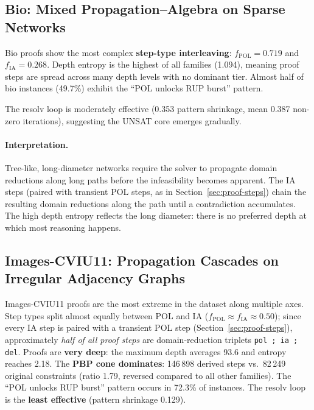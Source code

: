 \documentclass[11pt,a4paper]{article}
\begin{document}
\subsection{Bio: Mixed Propagation--Algebra on Sparse Networks}
\label{sec:fingerprint-bio}

Bio proofs show the most complex \textbf{step-type interleaving}: $f_{\mathrm{POL}} = 0.719$ and
$f_{\mathrm{IA}} = 0.268$.
Depth entropy is the highest of all families (1.094), meaning proof steps are spread across
many depth levels with no dominant tier.
Almost half of bio instances (49.7\%) exhibit the ``POL unlocks RUP burst'' pattern.

The resolv loop is moderately effective (0.353 pattern shrinkage, mean 0.387 non-zero iterations),
suggesting the UNSAT core emerges gradually.

\paragraph{Interpretation.} Tree-like, long-diameter networks require the solver to propagate
domain reductions along long paths before the infeasibility becomes apparent.
The IA steps (paired with transient POL steps, as in Section~\ref{sec:proof-steps}) chain the
resulting domain reductions along the path until a contradiction accumulates.
The high depth entropy reflects the long diameter: there is no preferred depth at which most
reasoning happens.

\subsection{Images-CVIU11: Propagation Cascades on Irregular Adjacency Graphs}
\label{sec:fingerprint-images}

Images-CVIU11 proofs are the most extreme in the dataset along multiple axes.
Step types split almost equally between POL and IA ($f_{\mathrm{POL}} \approx f_{\mathrm{IA}}
\approx 0.50$); since every IA step is paired with a transient POL step
(Section~\ref{sec:proof-steps}), approximately \emph{half of all proof steps} are
domain-reduction triplets \texttt{pol\,;\,ia\,;\,del}.
Proofs are \textbf{very deep}: the maximum depth averages 93.6 and entropy reaches 2.18.
The \textbf{PBP cone dominates}: 146\,898 derived steps vs.\ 82\,249 original constraints
(ratio 1.79, reversed compared to all other families).
The ``POL unlocks RUP burst'' pattern occurs in 72.3\% of instances.
The resolv loop is the \textbf{least effective} (pattern shrinkage 0.129).
\end{document}
